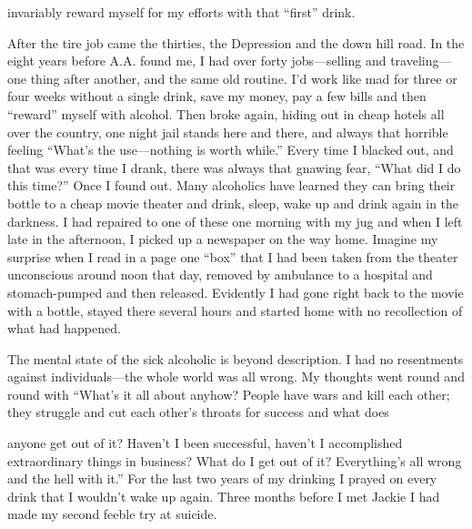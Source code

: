 invariably reward myself for my efforts with that “first” drink.

After the tire job came the thirties, the Depression and the down hill road. In the eight years before A.A. found me, I had over forty jobs—selling and traveling—one thing after another, and the same old routine. I’d work like mad for three or four weeks without a single drink, save my money, pay a few bills and then “reward” myself with alcohol. Then broke again, hiding out in cheap hotels all over the country, one night jail stands here and there, and always that horrible feeling “What’s the use—nothing is worth while.” Every time I blacked out, and that was every time I drank, there was always that gnawing fear, “What did I do this time?” Once I found out. Many alcoholics have learned they can bring their bottle to a cheap movie theater and drink, sleep, wake up and drink again in the darkness. I had repaired to one of these one morning with my jug and when I left late in the afternoon, I picked up a newspaper on the way home. Imagine my surprise when I read in a page one “box” that I had been taken from the theater unconscious around noon that day, removed by ambulance to a hospital and stomach-pumped and then released. Evidently I had gone right back to the movie with a bottle, stayed there several hours and started home with no recollection of what had happened.

The mental state of the sick alcoholic is beyond description. I had no resentments against individuals—the whole world was all wrong. My thoughts went round and round with “What’s it all about anyhow? People have wars and kill each other; they struggle and cut each other’s throats for success and what does

anyone get out of it? Haven’t I been successful, haven’t I accomplished extraordinary things in business? What do I get out of it? Everything’s all wrong and the hell with it.” For the last two years of my drinking I prayed on every drink that I wouldn’t wake up again. Three months before I met Jackie I had made my second feeble try at suicide.

